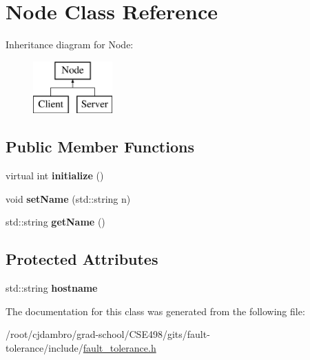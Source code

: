 \hypertarget{classNode}{\section{Node Class Reference}
\label{classNode}
}
Inheritance diagram for Node\-:\begin{figure}[H]
\begin{center}
\leavevmode
\includegraphics[height=2.000000cm]{classNode}
\end{center}
\end{figure}
\subsection*{Public Member Functions}
\begin{DoxyCompactItemize}
\item 
\hypertarget{classNode_acfbc12d3b7d414fb12811041b04a1809}{virtual int {\bfseries initialize} ()}\label{classNode_acfbc12d3b7d414fb12811041b04a1809}

\item 
\hypertarget{classNode_af79916b6bb2580b7cf9397bdeb172988}{void {\bfseries set\-Name} (std\-::string n)}\label{classNode_af79916b6bb2580b7cf9397bdeb172988}

\item 
\hypertarget{classNode_a3e5ac6b5881a3a9d82f3112953c1e546}{std\-::string {\bfseries get\-Name} ()}\label{classNode_a3e5ac6b5881a3a9d82f3112953c1e546}

\end{DoxyCompactItemize}
\subsection*{Protected Attributes}
\begin{DoxyCompactItemize}
\item 
\hypertarget{classNode_a9f5a57e15567a0b92cb8d25bcec7bd24}{std\-::string {\bfseries hostname}}\label{classNode_a9f5a57e15567a0b92cb8d25bcec7bd24}

\end{DoxyCompactItemize}


The documentation for this class was generated from the following file\-:\begin{DoxyCompactItemize}
\item 
/root/cjdambro/grad-\/school/\-C\-S\-E498/gits/fault-\/tolerance/include/\hyperlink{fault__tolerance_8h}{fault\-\_\-tolerance.\-h}\end{DoxyCompactItemize}
